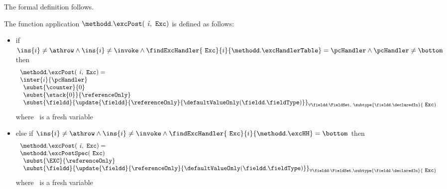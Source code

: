 The formal definition follows.
\begin{defExc}\label{defExc}
The function application $\methodd.\excPost( \mbox{ \rm \textit{i}} ,  \mbox{ \rm \texttt{Exc}} )   $ is defined as follows:
 \begin{itemize}
    \item if $  \ins{i} \neq \athrow \wedge \ins{i} \neq \invoke \wedge   \findExcHandler{\mbox{ \rm \texttt{Exc}} }{i}{\methodd.\excHandlerTable} = \pcHandler \wedge \pcHandler \neq \bottom    $ then 
      $$ \begin{array}{l}
           \methodd.\excPost( \mbox{ \rm \textit{i}} ,  \mbox{ \rm \texttt{Exc}}) = \\
           \inter{i}{\pcHandler}\\
                      \begin{array}{l}
                        \subst{\counter}{0} \\
			\subst{\stack{0}}{\referenceOnly} \\
                         \subst{ \fieldd} { \update{\fieldd} { \referenceOnly }{\defaultValueOnly( \fieldd.  \fieldType ) } }_{{\small \forall \fieldd : \FieldSet, \ 
                         \subtype{\fieldd.\declaredIn}{ \mbox{ \rm \texttt{Exc}}} } } 
                       \end{array} 
        \end{array}$$   
	where  \ is a fresh variable

   


    \item else if $\ins{i} \neq \athrow \wedge \ins{i} \neq \invoke \wedge   \findExcHandler{ \mbox{ \rm \texttt{Exc}}   }{i}{\methodd.\excHH} = \bottom $ then 
            $$\begin{array}{l}
                    \methodd.\excPost( \mbox{ \rm \textit{i}} ,  \mbox{ \rm \texttt{Exc}}) = \\
                        \methodd.\excPostSpec( \mbox{ \rm \texttt{Exc}}  ) \\
                     \begin{array}{l}
		           \subst{ \EXC }{\referenceOnly  }\\
                          \subst{ \fieldd}{ \update{\fieldd } { \referenceOnly }{\defaultValueOnly( \fieldd.\fieldType ) } }_{ {\small \forall \fieldd: \FieldSet, 
			   \subtype{\fieldd.\declaredIn}{ \mbox{ \rm \texttt{Exc}}} } }    \\
                    \end{array}  
             \end{array} $$
	where  \ is a fresh variable
    




\end{itemize}
\end{defExc}

